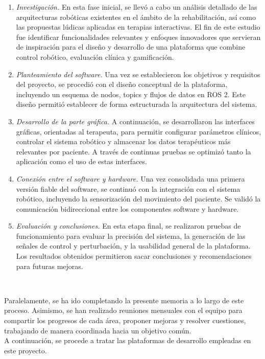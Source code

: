 \begin{enumerate}
    \item \textit{Investigación.} En esta fase inicial, se llevó a cabo un análisis detallado de las arquitecturas robóticas existentes en el ámbito de la rehabilitación, así como las propuestas lúdicas aplicadas en terapias interactivas. El fin de este estudio fue identificar funcionalidades relevantes y enfoques innovadores que servieran de inspiración para el diseño y desarrollo de una plataforma que combine control robótico, evaluación clínica y gamificación.
    \item \textit{Planteamiento del software.} Una vez se establecieron los objetivos y requisitos del proyecto, se procedió con el diseño conceptual de la plataforma, incluyendo un esquema de nodos, topics y flujos de datos en ROS 2. Este diseño permitió establecer de forma estructurada la arquitectura del sistema.
    \item \textit{Desarrollo de la parte gráfica.} A continuación, se desarrollaron las interfaces gráficas, orientadas al terapeuta, para permitir configurar parámetros clínicos, controlar el sistema robótico y almacenar los datos terapéuticos más relevantes por paciente. A través de continuas pruebas se optimizó tanto la aplicación como el uso de estas interfaces.
    \item \textit{Conexión entre el software y hardware.} Una vez consolidada una primera versión fiable del software, se continuó con la integración con el sistema robótico, incluyendo la sensorización del movimiento del paciente. Se validó la comunicación bidireccional entre los componentes software y hardware.
    \item \textit{Evaluación y conclusiones.} En esta etapa final, se realizaron pruebas de funcionamiento para evaluar la precisión del sistema, la generación de las señales de control y perturbación, y la usabilidad general de la plataforma. Los resultados obtenidos permitieron sacar conclusiones y recomendaciones para futuras mejoras.
\end{enumerate}\

Paralelamente, se ha ido completando la presente memoria a lo largo de este proceso.
Asimismo, se han realizado reuniones mensuales con el equipo para compartir los progresos de cada área, proponer mejoras y resolver cuestiones, trabajando de manera coordinada hacia un objetivo común.\\

A continuación, se procede a tratar las plataformas de desarrollo empleadas en este proyecto.
